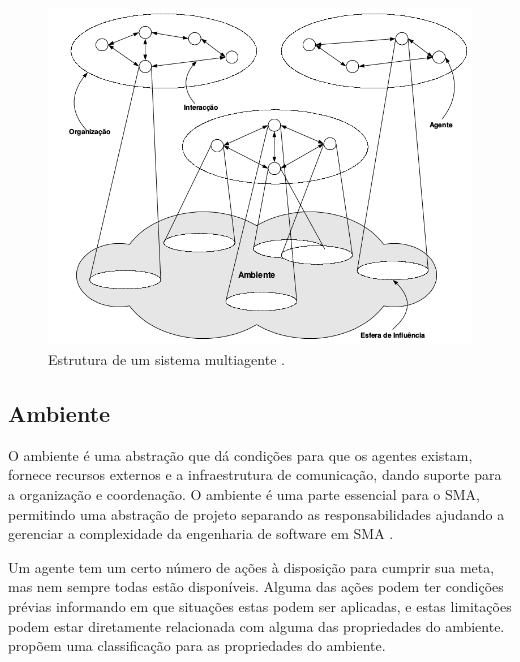 \begin{figure}[ht]
\centering
\includegraphics[scale=0.4]{imagens/sma_org.png}
\caption{Estrutura de um sistema multiagente \cite{jennings2000agent}.}
\label{fig:sma_org}
\end{figure}

\subsection{Ambiente}

  O ambiente é uma abstração que dá condições para que os agentes existam, fornece recursos externos e a infraestrutura de comunicação, dando suporte para a organização e coordenação. O ambiente é uma parte essencial para o SMA, permitindo uma abstração de projeto separando as responsabilidades ajudando a gerenciar a complexidade da engenharia de software em SMA \cite{weyns2007environment}.
  
  Um agente tem um certo número de ações à disposição para cumprir sua meta, mas nem sempre todas estão disponíveis. Alguma das ações podem ter condições prévias informando em que situações estas podem ser aplicadas, e estas limitações podem estar diretamente relacionada com alguma das propriedades do ambiente. \citet{russell2002artificial} propõem uma classificação para as propriedades do ambiente.
  

